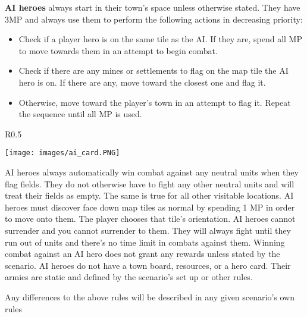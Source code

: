 \documentclass[12pt]{article}
\begin{document}
\clearpage
\textbf{AI heroes} always start in their town's space unless otherwise stated. They have 3MP and always use them to perform the following actions in decreasing priority:
\begin{itemize}
    \item Check if a player hero is on the same tile as the AI. If they are, spend all MP to move towards them in an attempt to begin combat.
    \item Check if there are any mines or settlements to flag on the map tile the AI hero is on. If there are any, move toward the closest one and flag it.
    \item Otherwise, move toward the player's town in an attempt to flag it. Repeat the sequence until all MP is used.
\end{itemize}
\begin{wrapfigure}{R}{0.5\textwidth}
    \begin{center}
    \texttt{[image: images/ai\_card.PNG]}
    \end{center}
\end{wrapfigure}
AI heroes always automatically win combat against any neutral units when they flag fields. They do not otherwise have to fight any other neutral units and will treat their fields as empty. The same is true for all other visitable locations. AI heroes must discover face down map tiles as normal by spending 1 MP in order to move onto them. The player chooses that tile’s orientation. AI heroes cannot surrender and you cannot surrender to them. They will always fight until they run out of units and there’s no time limit in combats against them. Winning combat against an AI hero does not grant any rewards unless stated by the scenario. AI heroes do not have a town board, resources, or a hero card. Their armies are static and defined by the scenario’s set up or other rules.\par

Any differences to the above rules will be described in any given scenario’s own rules
\end{document}
